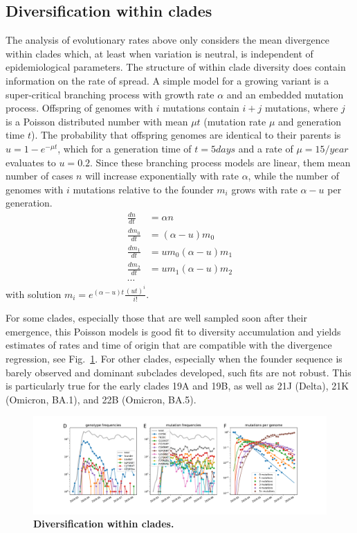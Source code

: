 \documentclass[aps,rmp, twocolumn]{revtex4}
\begin{document}
\subsection*{Diversification within clades}
The analysis of evolutionary rates above only considers the mean divergence within clades which, at least when variation is neutral, is independent of epidemiological parameters.
The structure of within clade diversity does contain information on the rate of spread.
A simple model for a growing variant is a super-critical branching process with growth rate $\alpha$ and an embedded mutation process.
Offspring of genomes with $i$ mutations contain $i+j$ mutations, where $j$ is a Poisson distributed number with mean $\mu t$ (mutation rate $\mu$ and generation time $t$).
The probability that offspring genomes are identical to their parents is $u = 1-e^{-\mu t}$, which for a generation time of $t=5days$ and a rate of $\mu = 15/year$ evaluates to $u=0.2$.
Since these branching process models are linear, them mean number of cases $n$ will increase exponentially with rate $\alpha$, while the number of genomes with $i$ mutations relative to the founder $m_i$ grows with rate $\alpha - u$ per generation.
\begin{equation}
    \begin{split}
        \frac{dn}{dt} &= \alpha n \\
        \frac{dm_0}{dt} &= (\alpha - u) m_0 \\
        \frac{dm_1}{dt} &= u m_0 (\alpha - u) m_1 \\
        \frac{dm_2}{dt} &= u m_1 (\alpha - u) m_2 \\
        \cdots
    \end{split}
\end{equation}
with solution $m_i = e^{(\alpha - u)t} \frac{(ut)^i}{i!}$.

For some clades, especially those that are well sampled soon after their emergence, this Poisson models is good fit to diversity accumulation and yields estimates of rates and time of origin that are compatible with the divergence regression, see Fig.~\ref{fig:within_clades}.
For other clades, especially when the founder sequence is barely observed and dominant subclades developed, such fits are not robust.
This is particularly true for the early clades 19A and 19B, as well as 21J (Delta), 21K (Omicron, BA.1), and 22B (Omicron, BA.5).

\begin{figure}
    \includegraphics[width=\textwidth]{figures/counts/20C_counts.pdf}
    \caption{{\bf Diversification within clades.} \label{fig:within_clades}}
\end{figure}
\end{document}
